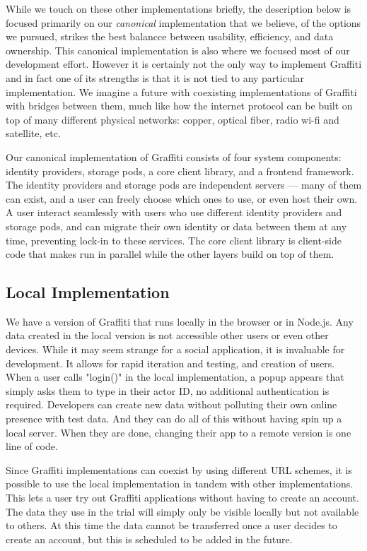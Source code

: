 While we touch on these other implementations briefly,
the description below is focused primarily on our \emph{canonical} implementation
that we believe, of the options we pursued, strikes
the best balancce between usability, efficiency, and data ownership.
This canonical implementation is also where we focused most of our development effort.
However it is certainly not the only way to implement Graffiti and
in fact one of its strengths is that it is not tied to any particular
implementation.
We imagine a future with coexisting implementations
of Graffiti with bridges between them, much like how the internet protocol
can be built on top of many different physical networks:
copper, optical fiber, radio wi-fi and satellite, etc.

Our canonical implementation of Graffiti consists of four system components:
identity providers, storage pods, a core client library, and a frontend framework.
The identity providers and storage pods are independent servers
--- many of them can exist, and a user can freely choose which ones to use, or even host their own.
A user interact seamlessly with users who use different identity providers and storage pods,
and can migrate their own identity or data between them at any time, preventing lock-in to these services.
The core client library is client-side code that makes
run in parallel while the other
layers build on top of them.

\subsection{Local Implementation}

We have a version of Graffiti that runs locally in the browser or in Node.js.
Any data created in the local version is not accessible other users or even other devices.
While it may seem strange for a social application, it is invaluable for development.
It allows for rapid iteration and testing, and creation of users.
When a user calls "login()" in the local implementation, a popup appears that
simply asks them to type in their actor ID, no additional authentication is required.
Developers can create new data without polluting their own online presence with test data.
And they can do all of this without having spin up a local server.
When they are done, changing their app to a remote version is one line of code.

Since Graffiti implementations can coexist by using different URL schemes,
it is possible to use the local implementation in tandem with other implementations.
This lets a user try out Graffiti applications without having to create an
account. The data they use in the trial will simply only be visible locally but
not available to others. At this time the data cannot be transferred once
a user decides to create an account, but this is scheduled to be added in the future.

